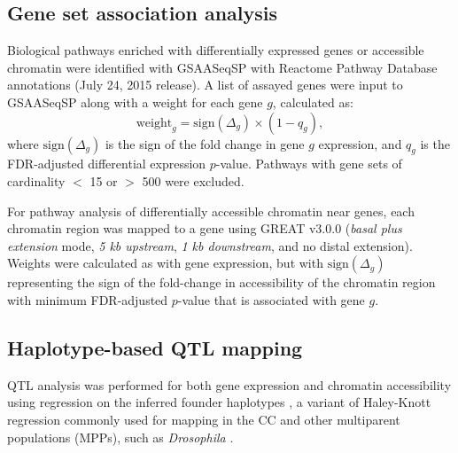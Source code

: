 \documentclass[10pt,letterpaper]{article}
\begin{document}
\subsection*{Gene set association analysis}

Biological pathways enriched with differentially expressed genes or accessible chromatin were identified with GSAASeqSP \cite{Xiong2014} with Reactome Pathway Database annotations (July 24, 2015 release). A list of assayed genes were input to GSAASeqSP along with a weight for each gene $g$, calculated as:
\begin{equation}
\text{weight}_{g} = \text{sign}(\Delta_{g}) \times (1-q_{g}),
\label{eq:gene_weighting}
\end{equation}
where $\text{sign}(\Delta_{g})$ is the sign of the fold change in gene $g$ expression, and $q_{g}$ is the FDR-adjusted differential expression $p$-value. Pathways with gene sets of cardinality $<$ 15 or $>$ 500 were excluded. 

For pathway analysis of differentially accessible chromatin near genes, each chromatin region was mapped to a gene using GREAT v3.0.0 (\textit{basal plus extension} mode, \textit{5 kb upstream}, \textit{1 kb downstream}, and no distal extension). 
Weights were calculated as with gene expression, but with $\text{sign}(\Delta_{g})$ representing the sign of the fold-change in accessibility of the chromatin region with minimum FDR-adjusted $p$-value that is associated with gene $g$.

\subsection*{Haplotype-based QTL mapping}

QTL analysis was performed for both gene expression and chromatin accessibility using regression on the inferred founder haplotypes \cite{Mott2000}, a variant of Haley-Knott regression \cite{Haley1992,Martinez1992} commonly used for mapping in the CC \cite{Valdar2006c,Aylor2011,Gralinski2015,Kelada2016,Donoghue2017,Keele2019} and other multiparent populations (MPPs), such as \textit{Drosophila} \cite{King2012}.
\end{document}
